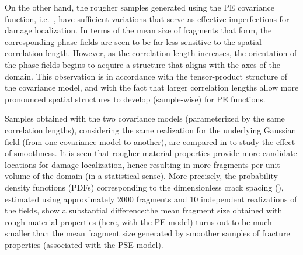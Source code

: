 On the other hand, the rougher samples generated using the PE covariance function, i.e.\ , have sufficient variations that serve as effective imperfections for damage localization. In terms of the mean size of fragments that form, the corresponding phase fields are seen to be far less sensitive to the spatial correlation length.  However, as the correlation length increases, the orientation of the phase fields begins to acquire a structure that aligns with the axes of the domain. This observation is in accordance with the tensor-product structure of the covariance model, and with the fact that larger correlation lengths allow more pronounced spatial structures to develop (sample-wise) for PE functions.





Samples obtained with the two covariance models (parameterized by the same correlation lengths), considering the same realization for the underlying Gaussian field (from one covariance model to another), are compared in  to study the effect of smoothness. It is seen that rougher material properties provide more candidate locations for damage localization, hence resulting in more fragments per unit volume of the domain (in a statistical sense). More precisely, the probability density functions (PDFs) corresponding to the dimensionless crack spacing (), estimated using approximately 2000 fragments and 10 independent realizations of the fields, show a substantial difference:the mean fragment size obtained with rough material properties (here, with the PE model) turns out to be much smaller than the mean fragment size generated by smoother samples of fracture properties (associated with the PSE model).

